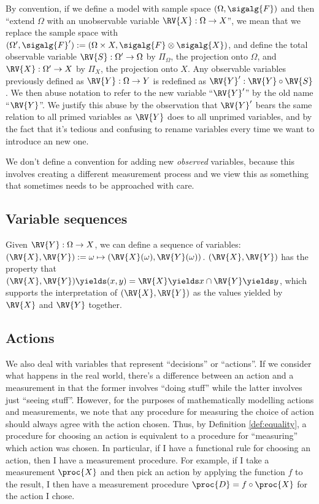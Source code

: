 By convention, if we define a model with sample space $(\Omega,\sigalg{F})$ and then ``extend $\Omega$ with an unobservable variable $\RV{X}:\Omega\to X$'', we mean that we replace the sample space with $(\Omega',\sigalg{F}'):=(\Omega\times X,\sigalg{F}\otimes\sigalg{X})$, and define the total observable variable $\RV{S}:\Omega'\to \Omega$ by $\Pi_\Omega$, the projection onto $\Omega$, and $\RV{X}:\Omega'\to X$ by $\Pi_X$, the projection onto $X$. Any observable variables previously defined as $\RV{Y}:\Omega\to Y$ is redefined as $\RV{Y}':\RV{Y}\circ \RV{S}$. We then abuse notation to refer to the new variable ``$\RV{Y}'$'' by the old name ``$\RV{Y}$''. We justify this abuse by the observation that $\RV{Y}'$ bears the same relation to all primed variables as $\RV{Y}$ does to all unprimed variables, and by the fact that it's tedious and confusing to rename variables every time we want to introduce an new one.

We don't define a convention for adding new \emph{observed} variables, because this involves creating a different measurement process and we view this as something that sometimes needs to be approached with care.

\subsection{Variable sequences}

Given $\RV{Y}:\Omega\to X$, we can define a sequence of variables: $(\RV{X},\RV{Y}):=\omega\mapsto (\RV{X}(\omega),\RV{Y}(\omega))$. $(\RV{X},\RV{Y})$ has the property that $(\RV{X},\RV{Y})\yields (x,y)= \RV{X}\yields x\cap \RV{Y}\yields y$, which supports the interpretation of $(\RV{X},\RV{Y})$ as the values yielded by $\RV{X}$ and $\RV{Y}$ together.

\subsection{Actions}\label{sec:actions}

We also deal with variables that represent ``decisions'' or ``actions''. If we consider what happens in the real world, there's a difference between an action and a measurement in that the former involves ``doing stuff'' while the latter involves just ``seeing stuff''. However, for the purposes of mathematically modelling actions and measurements, we note that any procedure for measuring the choice of action should always agree with the action chosen. Thus, by Definition \ref{def:equality}, a procedure for choosing an action is equivalent to a procedure for ``measuring'' which action was chosen. In particular, if I have a functional rule for choosing an action, then I have a measurement procedure. For example, if I take a measurement $\proc{X}$ and then pick an action by applying the function $f$ to the result, I then have a measurement procedure $\proc{D}=f\circ \proc{X}$ for the action I chose.